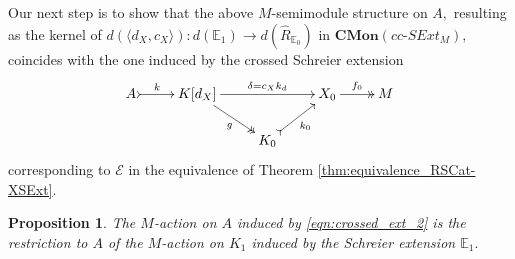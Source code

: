 \documentclass[a4paper]{amsart}
\theoremstyle{plain}
\newtheorem{proposition}[subsection]{Proposition}
\theoremstyle{definition}
\theoremstyle{remark}
\newcommand{\la}{\langle}
\newcommand{\ra}{\rangle}
\begin{document}
Our next step is to show that the above $M$-semimodule structure on $A,$ resulting as the kernel of $d(\la d_X,c_X \ra)\colon d({\mathbb{E}}_1)\longrightarrow d(\widehat{R}_{{\mathbb{E}}_0})$ in $\mathbf{CMon}(cc\text{-}SExt_M),$ coincides with the one induced by the crossed Schreier extension
\begin{equation}
\label{eqn:crossed_ext_2}
\begin{aligned}
\xymatrixrowsep{1.5pc}
\xymatrix{
{A} \ar@{>->}[r]^-{k} &{K[d_X]} \ar[rr]^-{\delta=c_Xk_d} \ar@{->>}[rd]_-g &\ &{X_0} \ar@{->>}[r]^-{f_0} &{M} \\
&\ &{K_0} \ar@{>->}[ru]_-{k_0} &\ &\
}
\end{aligned}
\end{equation}
corresponding to $\mathcal{E}$ in the equivalence of Theorem \ref{thm:equivalence_RSCat-XSExt}.
\begin{proposition}
\label{prop:same_action}
The $M$-action on $A$ induced by \eqref{eqn:crossed_ext_2} is the restriction to $A$ of the $M$-action on $K_1$ induced by the Schreier extension ${\mathbb{E}}_1.$
\end{proposition}
\end{document}
